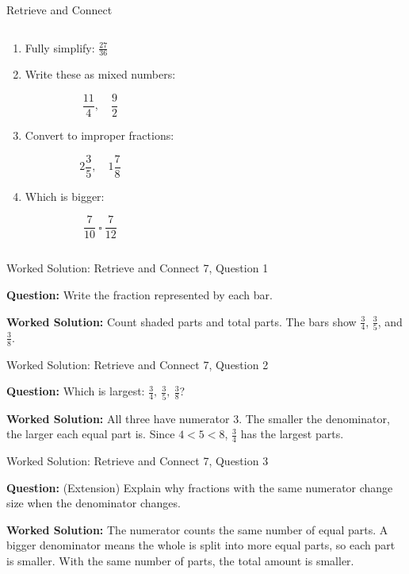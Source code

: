 \documentclass{beamer}
\newcommand{\ashow}[1]{\uncover<2->{\textcolor{red}{\small #1}}}
\begin{document}
\begin{frame}{Retrieve and Connect}
\begin{columns}
\begin{multicols}{2}
\begin{enumerate}
\columnbreak

\item Fully simplify: $
\frac{27}{36}
$ \ashow{$\frac{3}{4}$}

\item Write these as mixed numbers:

\[
\frac{11}{4},\quad \frac{9}{2}
\]
\ashow{$2\frac{3}{4},\ 4\frac{1}{2}$}

\item Convert to improper fractions:

\[
2\frac{3}{5},\quad 1\frac{7}{8}
\]
\ashow{$\frac{13}{5},\ \frac{15}{8}$}

\item Which is bigger:

\[
\frac{7}{10}\ \square\ \frac{7}{12}
\]
\ashow{$\frac{7}{10}$}

\end{enumerate}

\end{multicols}

\end{columns}

\end{frame}

\begin{frame}{Worked Solution: Retrieve and Connect 7, Question 1}
\hypertarget{work-st7}{}

\textbf{Question:} Write the fraction represented by each bar.

\textbf{Worked Solution:} Count shaded parts and total parts. The bars show $\frac34$, $\frac35$, and $\frac38$. \ashow{$\frac34,\ \frac35,\ \frac38$.}
\end{frame}

\begin{frame}{Worked Solution: Retrieve and Connect 7, Question 2}

\textbf{Question:} Which is largest: $\frac{3}{4},\ \frac{3}{5},\ \frac{3}{8}$?

\textbf{Worked Solution:} All three have numerator 3. The smaller the denominator, the larger each equal part is. Since $4<5<8$, $\frac34$ has the largest parts. \ashow{$\frac34$ is largest.}
\end{frame}

\begin{frame}{Worked Solution: Retrieve and Connect 7, Question 3}

\textbf{Question:} (Extension) Explain why fractions with the same numerator change size when the denominator changes.

\textbf{Worked Solution:} The numerator counts the same number of equal parts. A bigger denominator means the whole is split into more equal parts, so each part is smaller. With the same number of parts, the total amount is smaller. \ashow{The larger the denominator, the smaller each equal part is, so the fraction is smaller.}
\end{frame}
\end{document}
